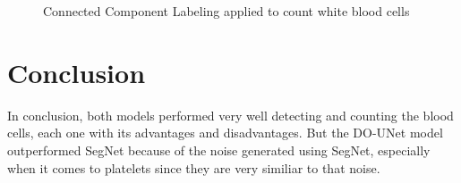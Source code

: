 \begin{figure}[H]
\centering
\begin{minipage}{.5\textwidth}
  \centering
\end{minipage}%
\begin{minipage}{.5\textwidth}
  \centering
\end{minipage}
  \caption{Connected Component Labeling applied to count white blood cells}
\end{figure}

\section{Conclusion}
In conclusion, both models performed very well detecting and counting the blood cells, each one with its advantages and disadvantages.
But the DO-UNet model outperformed SegNet because of the noise generated using SegNet, especially when it comes to platelets since they are very similiar to that noise.

\newpage
